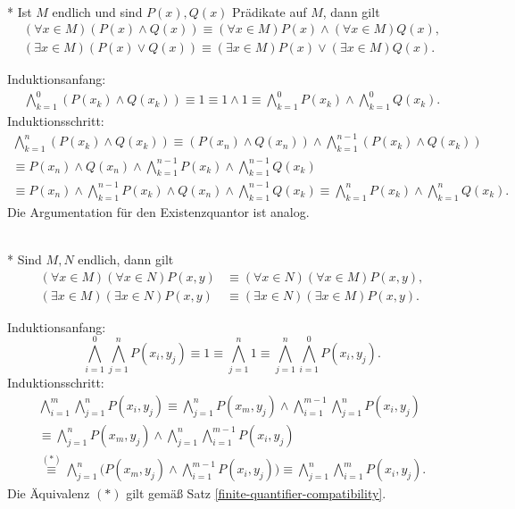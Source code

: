 \newpage
\begin{Satz}[Verträglichkeitsgesetze]%
\label{finite-quantifier-compatibility}\mbox{}\\*
Ist $M$ endlich und sind $P(x),Q(x)$ Prädikate auf $M$, dann gilt
\begin{align*}
(\forall x\in M)(P(x)\land Q(x)) \equiv (\forall x\in M)P(x)\land(\forall x\in M)Q(x),\\
(\exists x\in M)(P(x)\lor Q(x)) \equiv (\exists x\in M)P(x)\lor(\exists x\in M)Q(x).
\end{align*}
\end{Satz}
 Induktionsanfang:
\begin{gather*}
\bigwedge_{k=1}^0 (P(x_k)\land Q(x_k)) \equiv 1 \equiv 1\land 1
\equiv \bigwedge_{k=1}^0 P(x_k)\land\bigwedge_{k=1}^0 Q(x_k).
\end{gather*}
Induktionsschritt:
\begin{gather*}
\bigwedge_{k=1}^n (P(x_k)\land Q(x_k))
\equiv (P(x_n)\land Q(x_n))\land\bigwedge_{k=1}^{n-1} (P(x_k)\land Q(x_k))\\
\equiv P(x_n)\land Q(x_n)\land\bigwedge_{k=1}^{n-1} P(x_k)\land\bigwedge_{k=1}^{n-1} Q(x_k)\\
\equiv P(x_n)\land\bigwedge_{k=1}^{n-1} P(x_k)\land Q(x_n)\land\bigwedge_{k=1}^{n-1} Q(x_k)
\equiv \bigwedge_{k=1}^n P(x_k)\land\bigwedge_{k=1}^n Q(x_k).
\end{gather*}
Die Argumentation für den Existenzquantor ist analog.\;\qedsymbol

\begin{Satz}\mbox{}\\*
Sind $M,N$ endlich, dann gilt
\begin{align*}
(\forall x\in M)(\forall x\in N)P(x,y)&\equiv (\forall x\in N)(\forall x\in M)P(x,y),\\
(\exists x\in M)(\exists x\in N)P(x,y)&\equiv (\exists x\in N)(\exists x\in M)P(x,y).
\end{align*}
\end{Satz}
Induktionsanfang:
\[\bigwedge_{i=1}^0\bigwedge_{j=1}^n P(x_i,y_j)
\equiv 1 \equiv \bigwedge_{j=1}^n 1 \equiv
\bigwedge_{j=1}^n\bigwedge_{i=1}^0 P(x_i,y_j).\]
Induktionsschritt:
\begin{gather*}
\bigwedge_{i=1}^m\bigwedge_{j=1}^n P(x_i,y_j)
\equiv \bigwedge_{j=1}^n P(x_m,y_j)\land\bigwedge_{i=1}^{m-1}\bigwedge_{j=1}^n P(x_i,y_j)\\
\equiv \bigwedge_{j=1}^n P(x_m,y_j)\land\bigwedge_{j=1}^n \bigwedge_{i=1}^{m-1} P(x_i,y_j)\\
\stackrel{(*)}\equiv \bigwedge_{j=1}^n \bigg(P(x_m,y_j)\land\bigwedge_{i=1}^{m-1} P(x_i,y_j)\bigg)
\equiv \bigwedge_{j=1}^n \bigwedge_{i=1}^m P(x_i,y_j).
\end{gather*}
Die Äquivalenz $(*)$ gilt gemäß Satz \ref{finite-quantifier-compatibility}.

